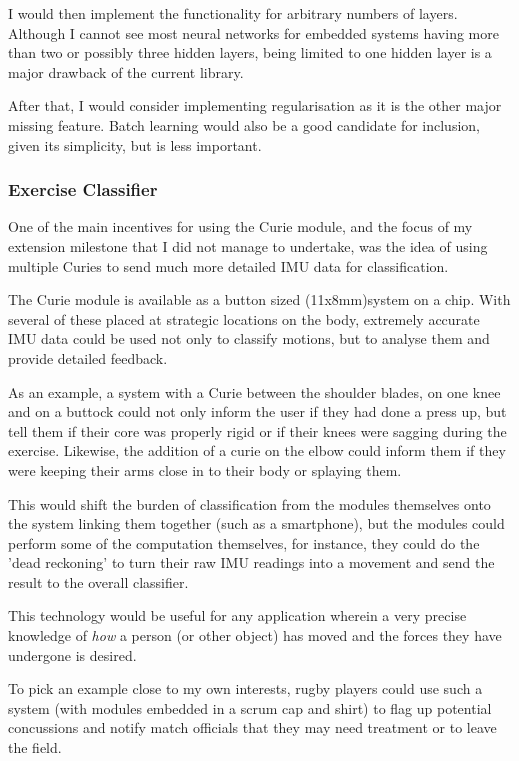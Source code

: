 \documentclass[a4paper]{article}
\begin{document}
I would then implement the functionality for arbitrary numbers of layers. Although I cannot see most neural networks for embedded systems having more than two or possibly three hidden layers, being limited to one hidden layer is a major drawback of the current library. 

After that, I would consider implementing regularisation as it is the other major missing feature. Batch learning would also be a good candidate for inclusion, given its simplicity, but is less important.

\subsubsection{Exercise Classifier}

One of the main incentives for using the Curie module, and the focus of my extension milestone that I did not manage to undertake, was the idea of using multiple Curies to send much more detailed IMU data for classification.

The Curie module is available as a button sized (11x8mm)system on a chip.\cite{fwref2} With several of these placed at strategic locations on the body, extremely accurate IMU data could be used not only to classify motions, but to analyse them and provide detailed feedback.

As an example, a system with a Curie between the shoulder blades, on one knee and on a buttock could not only inform the user if they had done a press up, but tell them if their core was properly rigid or if their knees were sagging during the exercise. Likewise, the addition of a curie on the elbow could inform them if they were keeping their arms close in to their body or splaying them.

This would shift the burden of classification from the modules themselves onto the system linking them together (such as a smartphone), but the modules could perform some of the computation themselves, for instance, they could do the 'dead reckoning' to turn their raw IMU readings into a movement and send the result to the overall classifier.

This technology would be useful for any application wherein a very precise knowledge of \textit{how} a person (or other object) has moved and the forces they have undergone is desired.

To pick an example close to my own interests, rugby players could use such a system (with modules embedded in a scrum cap and shirt) to flag up potential concussions and notify match officials that they may need treatment or to leave the field.
\end{document}
